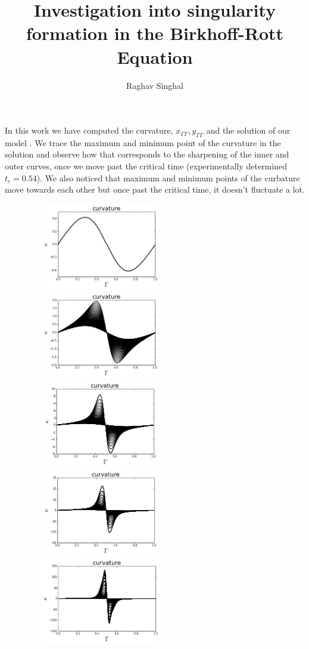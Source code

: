 \documentclass[12pt,twoside]{article}
\title{Investigation into singularity formation in the Birkhoff-Rott Equation }
\author{Raghav Singhal}
\begin{document}
\maketitle

In this work we have computed the curvature, $x_{\Gamma \Gamma} ,        y_{\Gamma \Gamma}$ and the solution of our model . We trace the maximum and minimum point of the curvature in the solution and observe how that corresponds to the sharpening of the inner and outer curves, once we move past the critical time (experimentally determined  $t_c=0.54$). We also noticed that maximum and minimum points of the curbature move towards each other but once past the critical time, it doesn't fluctuate a lot.
\begin{figure}[ht]
\centering
\begin{minipage}[b]{0.45\linewidth}
\includegraphics[width=2.5in,height=1.5in]{curvatureT0.png}
\includegraphics[width=2.5in,height=1.5in]{curvatureT04.png}
\includegraphics[width=2.5in,height=1.5in]{curvatureT054.png}
\includegraphics[width=2.5in,height=1.5in]{curvatureT06.png}
\includegraphics[width=2.5in,height=1.5in]{curvatureT07.png}



\end{minipage}
\end{figure}
\end{document}
